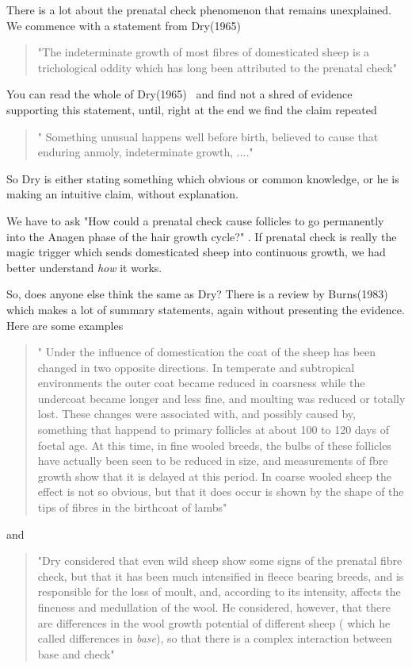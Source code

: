 \documentclass[titlepage]{article}  %
\begin{document}
There is a lot about the prenatal check phenomenon that remains unexplained. We commence with a statement from Dry(1965)~\cite{dry:65}

\begin{quote}
 "The indeterminate growth of most fibres of domesticated sheep is a trichological oddity which has long been attributed to the prenatal check"
\end{quote}

You can read the whole of Dry(1965)~\cite{dry:65} and find not a shred of evidence  supporting this statement, until, right at the end we find the claim repeated

\begin{quote}
" Something unusual happens well before birth, believed to cause that enduring anmoly, indeterminate growth, ...."
\end{quote}

So Dry is either stating something which obvious or common knowledge, or he is making an intuitive claim, without explanation.

We have to ask "How could a prenatal check cause follicles to go permanently into the Anagen phase of the hair growth cycle?" . If prenatal check is really the magic trigger which sends domesticated sheep into continuous growth, we had better understand {\em how} it works.

So, does anyone else think the same as Dry?  There is a review  by Burns(1983)~\cite{burn:83} which makes a lot of summary statements, again without presenting the evidence. Here are some examples
\begin{quote}
" Under the influence of domestication the coat of the sheep has been changed in two opposite directions. In temperate and subtropical environments the outer coat became reduced in coarsness while the undercoat became longer and less fine, and moulting was reduced or totally lost. These changes were associated with, and possibly caused by, something that happend to primary follicles at about 100 to 120 days of foetal age. At this time, in fine wooled breeds, the bulbs of these follicles have actually been seen to be reduced in size, and measurements of fbre growth show that it is delayed at this period. In coarse wooled sheep the effect is not so obvious, but that it does occur is shown by the shape of the tips of fibres in the birthcoat of lambs"
\end{quote}
and 
\begin{quote}
"Dry considered that even wild sheep show some signs of the prenatal fibre check, but that it has been much intensified in fleece bearing breeds, and is responsible for the loss of moult, and, according to its intensity, affects the fineness and medullation of the wool. He considered, however, that there are differences in the wool growth potential of different sheep ( which he called differences in {\em base}), so that there is a complex interaction between base and check"
\end{quote}
\end{document}

